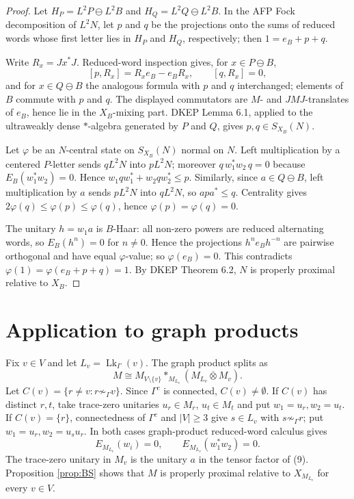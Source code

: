 \documentclass[12pt]{article}
\DeclareMathOperator{\Lk}{Lk}
\newcommand{\bbarotimes}{\mathbin{\overline{\otimes}}}
\begin{document}
\begin{proof}
Let \(H_P=L^2P\ominus L^2B\) and \(H_Q=L^2Q\ominus L^2B\).  In the AFP Fock
decomposition of \(L^2N\), let \(p\) and \(q\) be the projections onto the sums
of reduced words whose first letter lies in \(H_P\) and \(H_Q\), respectively;
then \(1=e_B+p+q\).

Write \(R_x=Jx^*J\).  Reduced-word inspection gives, for \(x\in P\ominus B\),
\[
        [p,R_x]=R_xe_B-e_BR_x,\qquad [q,R_x]=0,
\]
and for \(x\in Q\ominus B\) the analogous formula with \(p\) and \(q\)
interchanged; elements of \(B\) commute with \(p\) and \(q\).  The displayed
commutators are \(M\)- and \(JMJ\)-translates of \(e_B\), hence lie in the
\(X_B\)-mixing part.  DKEP Lemma 6.1, applied to the ultraweakly dense
\(*\)-algebra generated by \(P\) and \(Q\), gives \(p,q\in S_{X_B}(N)\).

Let \(\varphi\) be an \(N\)-central state on \(S_{X_B}(N)\) normal on \(N\).
Left multiplication by a centered \(P\)-letter sends \(qL^2N\) into \(pL^2N\);
moreover \(q\,w_1^*w_2\,q=0\) because \(E_B(w_1^*w_2)=0\).  Hence
\(w_1qw_1^*+w_2qw_2^*\le p\).  Similarly, since \(a\in Q\ominus B\), left
multiplication by \(a\) sends \(pL^2N\) into \(qL^2N\), so \(apa^*\le q\).
Centrality gives \(2\varphi(q)\le\varphi(p)\le\varphi(q)\), hence
\(\varphi(p)=\varphi(q)=0\).

The unitary \(h=w_1a\) is \(B\)-Haar: all non-zero powers are reduced
alternating words, so \(E_B(h^n)=0\) for \(n\ne0\).  Hence the projections
\(h^ne_Bh^{-n}\) are pairwise orthogonal and have equal \(\varphi\)-value; so
\(\varphi(e_B)=0\).  This contradicts
\(\varphi(1)=\varphi(e_B+p+q)=1\).  By DKEP Theorem 6.2, \(N\) is properly
proximal relative to \(X_B\).
\end{proof}

\section*{Application to graph products}

Fix \(v\in V\) and let \(L_v=\Lk_\Gamma(v)\).  The graph product splits as
\[
        M\cong M_{V\setminus\{v\}}*_{M_{L_v}}
        (M_{L_v}\bbarotimes M_v).                                \tag{9}
\]
Let \(C(v)=\{r\ne v:r\not\sim_\Gamma v\}\).  Since \(\Gamma^c\) is connected,
\(C(v)\ne\emptyset\).  If \(C(v)\) has distinct \(r,t\), take trace-zero
unitaries \(u_r\in M_r\), \(u_t\in M_t\) and put \(w_1=u_r,w_2=u_t\).  If
\(C(v)=\{r\}\), connectedness of \(\Gamma^c\) and \(|V|\ge3\) give
\(s\in L_v\) with \(s\not\sim_\Gamma r\); put \(w_1=u_r,w_2=u_su_r\).  In both
cases graph-product reduced-word calculus gives
\[
        E_{M_{L_v}}(w_i)=0,\qquad
        E_{M_{L_v}}(w_1^*w_2)=0 .
\]
The trace-zero unitary in \(M_v\) is the unitary \(a\) in the tensor factor of
(9).  Proposition \ref{prop:BS} shows that \(M\) is properly proximal relative
to \(X_{M_{L_v}}\) for every \(v\in V\).
\end{document}
